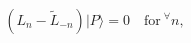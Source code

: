 \begin{equation}
(L_n-\tilde L_{-n})|P\rangle=0 \quad \mbox{for}~ {}^{\forall} n,
\label{conformal cond}
\end{equation}

